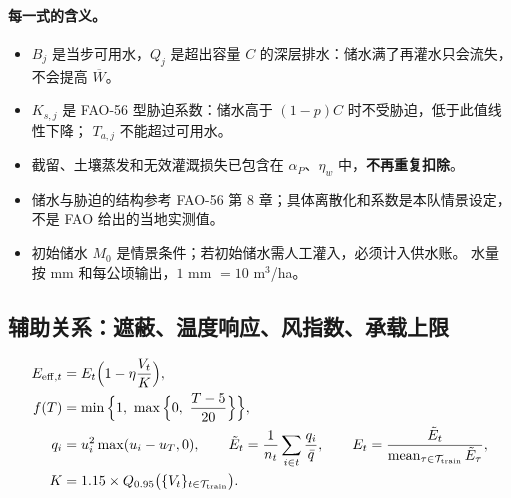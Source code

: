 \documentclass[11pt,a4paper]{ctexart}
\begin{document}
\paragraph{每一式的含义。}
\begin{itemize}
\item $B_j$ 是当步可用水，$Q_j$ 是超出容量 $C$ 的深层排水：储水满了再灌水只会流失，不会提高 $\overline W$。
\item $K_{s,j}$ 是 FAO-56 型胁迫系数：储水高于 $(1-p)C$ 时不受胁迫，低于此值线性下降；
$T_{a,j}$ 不能超过可用水。
\item 截留、土壤蒸发和无效灌溉损失已包含在 $\alpha_P$、$\eta_w$ 中，\textbf{不再重复扣除}。
\item 储水与胁迫的结构参考 FAO-56 第 8 章；具体离散化和系数是本队情景设定，不是 FAO 给出的当地实测值。
\item 初始储水 $M_0$ 是情景条件；若初始储水需人工灌入，必须计入供水账。
水量按 mm 和每公顷输出，$1$ mm $=10$ m$^3$/ha。
\end{itemize}

\subsection{辅助关系：遮蔽、温度响应、风指数、承载上限}

\begin{align}
E_{\mathrm{eff},t}&=E_t\Big(1-\eta\frac{V_t}{K}\Big),\label{eq:eeff}\\
f(T)&=\min\Big\{1,\ \max\Big\{0,\ \frac{T-5}{20}\Big\}\Big\},\label{eq:fT}\\
q_i&=u_i^{2}\max(u_i-u_T,0),\qquad
\tilde E_t=\frac{1}{n_t}\sum_{i\in t}\frac{q_i}{\bar q},\qquad
E_t=\frac{\tilde E_t}{\operatorname{mean}_{\tau\in\mathcal T_{\rm train}}\tilde E_\tau},\label{eq:lettau}\\
K&=1.15\times Q_{0.95}\big(\{V_t\}_{t\in\mathcal{T}_{\mathrm{train}}}\big).\label{eq:K}
\end{align}
\end{document}
